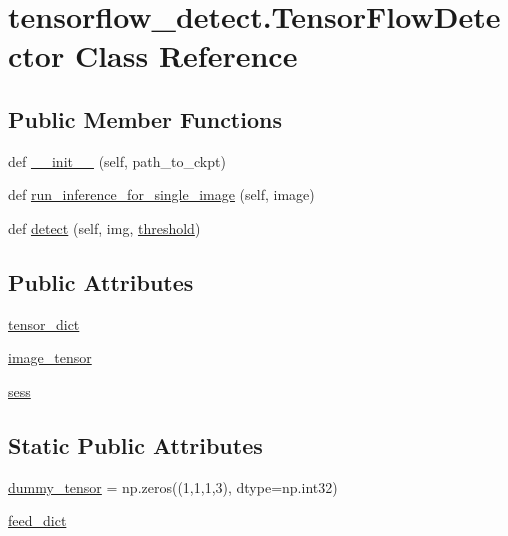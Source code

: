 \hypertarget{classtensorflow__detect_1_1_tensor_flow_detector}{}\section{tensorflow\+\_\+detect.\+Tensor\+Flow\+Detector Class Reference}
\label{classtensorflow__detect_1_1_tensor_flow_detector}
\subsection*{Public Member Functions}
\begin{DoxyCompactItemize}
\item 
def \hyperlink{classtensorflow__detect_1_1_tensor_flow_detector_a93c5505340a2adfd4505a3299b8ae4b8}{\+\_\+\+\_\+init\+\_\+\+\_\+} (self, path\+\_\+to\+\_\+ckpt)
\item 
def \hyperlink{classtensorflow__detect_1_1_tensor_flow_detector_a691b64feeb99ad6f9bc091c95bae01f1}{run\+\_\+inference\+\_\+for\+\_\+single\+\_\+image} (self, image)
\item 
def \hyperlink{classtensorflow__detect_1_1_tensor_flow_detector_a6bc7adeea3ea117897cca495a46fb55a}{detect} (self, img, \hyperlink{namespacetensorflow__detect_a92f27be303bb36c28ed99f95a89104b1}{threshold})
\end{DoxyCompactItemize}
\subsection*{Public Attributes}
\begin{DoxyCompactItemize}
\item 
\hyperlink{classtensorflow__detect_1_1_tensor_flow_detector_af28b6b2ea938da5a5fcfd755f22bdafe}{tensor\+\_\+dict}
\item 
\hyperlink{classtensorflow__detect_1_1_tensor_flow_detector_a185cf2de088861188c614957c31278fe}{image\+\_\+tensor}
\item 
\hyperlink{classtensorflow__detect_1_1_tensor_flow_detector_a65b0bb63ecdf52de6732e5f8d0efc533}{sess}
\end{DoxyCompactItemize}
\subsection*{Static Public Attributes}
\begin{DoxyCompactItemize}
\item 
\hyperlink{classtensorflow__detect_1_1_tensor_flow_detector_a2cf3856b888126fcd80d48e88e666107}{dummy\+\_\+tensor} = np.\+zeros((1,1,1,3), dtype=np.\+int32)
\item 
\hyperlink{classtensorflow__detect_1_1_tensor_flow_detector_a8c873949217953989176a8cccaf97b54}{feed\+\_\+dict}
\end{DoxyCompactItemize}


